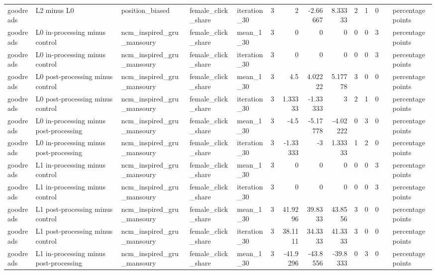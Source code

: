 \begin{table}[htbp!]
\begin{tabular}{lllllrrrrrrrll}
goodreads & L2 minus L0 & position\_biased & female\_click\_share & iteration\_30 & 3 & 2 & -2.66667 & 8.33333 & 2 & 1 & 0 &  & percentage points \\
goodreads & L0 in-processing minus control & ncm\_inspired\_gru\_mansoury & female\_click\_share & mean\_1\_30 & 3 & 0 & 0 & 0 & 0 & 0 & 3 &  & percentage points \\
goodreads & L0 in-processing minus control & ncm\_inspired\_gru\_mansoury & female\_click\_share & iteration\_30 & 3 & 0 & 0 & 0 & 0 & 0 & 3 &  & percentage points \\
goodreads & L0 post-processing minus control & ncm\_inspired\_gru\_mansoury & female\_click\_share & mean\_1\_30 & 3 & 4.5 & 4.02222 & 5.17778 & 3 & 0 & 0 &  & percentage points \\
goodreads & L0 post-processing minus control & ncm\_inspired\_gru\_mansoury & female\_click\_share & iteration\_30 & 3 & 1.33333 & -1.33333 & 3 & 2 & 1 & 0 &  & percentage points \\
goodreads & L0 in-processing minus post-processing & ncm\_inspired\_gru\_mansoury & female\_click\_share & mean\_1\_30 & 3 & -4.5 & -5.17778 & -4.02222 & 0 & 3 & 0 &  & percentage points \\
goodreads & L0 in-processing minus post-processing & ncm\_inspired\_gru\_mansoury & female\_click\_share & iteration\_30 & 3 & -1.33333 & -3 & 1.33333 & 1 & 2 & 0 &  & percentage points \\
goodreads & L1 in-processing minus control & ncm\_inspired\_gru\_mansoury & female\_click\_share & mean\_1\_30 & 3 & 0 & 0 & 0 & 0 & 0 & 3 &  & percentage points \\
goodreads & L1 in-processing minus control & ncm\_inspired\_gru\_mansoury & female\_click\_share & iteration\_30 & 3 & 0 & 0 & 0 & 0 & 0 & 3 &  & percentage points \\
goodreads & L1 post-processing minus control & ncm\_inspired\_gru\_mansoury & female\_click\_share & mean\_1\_30 & 3 & 41.9296 & 39.8333 & 43.8556 & 3 & 0 & 0 &  & percentage points \\
goodreads & L1 post-processing minus control & ncm\_inspired\_gru\_mansoury & female\_click\_share & iteration\_30 & 3 & 38.1111 & 34.3333 & 41.3333 & 3 & 0 & 0 &  & percentage points \\
goodreads & L1 in-processing minus post-processing & ncm\_inspired\_gru\_mansoury & female\_click\_share & mean\_1\_30 & 3 & -41.9296 & -43.8556 & -39.8333 & 0 & 3 & 0 &  & percentage points \\

\end{tabular}
\end{table}
